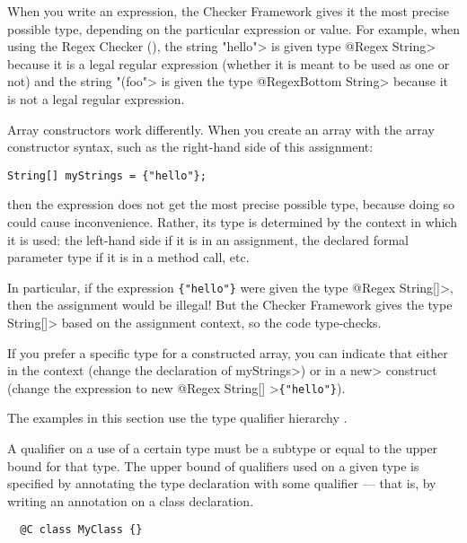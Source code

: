 
When you write an expression, the Checker Framework gives it the most
precise possible type, depending on the particular expression or value.
For example, when using the Regex Checker (),
the string \<"hello"> is given type \<@Regex String> because it is a legal
regular expression (whether it is meant to be used as one or not) and the
string \<"(foo"> is given the type \<@RegexBottom String> because it is not
a legal regular expression.

Array constructors work differently.  When you create an array with the
array constructor syntax, such as the right-hand side of this assignment:

\begin{Verbatim}
String[] myStrings = {"hello"};
\end{Verbatim}

\noindent
then the expression does not get the most precise possible type, because
doing so could cause inconvenience.  Rather, its type is determined by the
context in which it is used:  the left-hand side if it is in an assignment,
the declared formal parameter type if it is in a method call, etc.

In particular, if the expression \verb|{"hello"}| were given the type
\<@Regex String[]>, then the assignment would be illegal!  But the Checker
Framework gives the type \<String[]> based on the assignment context, so the code
type-checks.

If you prefer a specific type for a constructed array, you can indicate
that either in the context (change the declaration of \<myStrings>) or in a
\<new> construct (change the expression to \<new @Regex String[] >\verb|{"hello"}|).



The examples in this section use the type qualifier hierarchy .

A qualifier on a use of a certain type must be a subtype or equal to the upper bound for that type.
The upper bound of qualifiers used on a given type is specified by annotating the type declaration
with some qualifier --- that is, by writing an annotation on a class declaration.
\begin{Verbatim}
  @C class MyClass {}
\end{Verbatim}

